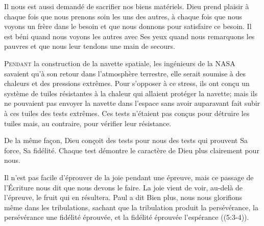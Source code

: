 Il nous est aussi demandé de sacrifier nos biens matériels.
 Dieu prend plaisir à chaque fois que nous prenons soin les uns des autres,
 à chaque fois que nous voyons un frère dans le besoin et que nous donnons
 pour satisfaire ce besoin. Il est béni quand nous voyons les autres
 avec Ses yeux \ocadr quand nous remarquons les pauvres
 et que nous leur tendons une main de secours. 


\dvrule






\lettrine{P}{endant} la construction de la navette spatiale,
 les ingénieurs de la NASA savaient qu'à son retour
 dans l'atmosphère terrestre, elle serait soumise à des chaleurs
 et des pressions extrêmes.
 Pour s'opposer à ce stress, ils ont con\c{c}u un système de tuiles
 résistantes à la chaleur qui allaient protéger la navette;
 mais ils ne pouvaient pas envoyer la navette dans l'espace
 sans avoir auparavant fait subir à ces tuiles des tests extrêmes.
 Ces tests n'étaient pas con\c{c}us pour détruire les tuiles mais,
 au contraire, pour vérifier leur résistance. 

De la même fa\c{c}on, Dieu con\c{c}oit des tests pour nous \ocadr des tests
 qui prouvent Sa force, Sa fidélité. Chaque test démontre
 le caractère de Dieu plus clairement pour nous. 


Il n'est pas facile d'éprouver de la joie pendant une épreuve,
 mais ce passage de l'Écriture nous dit que nous devons le faire.
 La joie vient de voir, au-delà de l'épreuve, le fruit qui en résultera.
 Paul a dit\frcolon{} 
 \Og Bien plus, nous nous glorifions même dans les tribulations,
 sachant que la tribulation produit la persévérance,
 la persévérance une fidélité éprouvée,
 et la fidélité éprouvée l'espérance \Fg{} ((5:3-4)). 


